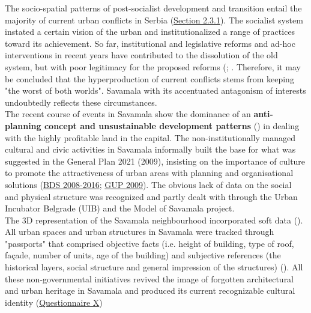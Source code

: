 \documentclass[11pt]{report}
\begin{document}
The socio-spatial patterns of post-socialist development and transition entail the majority of current urban conflicts in Serbia (\href{Section 2.3.1}{Section 2.3.1}).
The socialist system instated a certain vision of the urban and institutionalized a range of practices toward its achievement. So far, institutional and legislative reforms and ad-hoc interventions in recent years have contributed to the dissolution of the old system, but with poor legitimacy for the proposed reforms (\href{ref}{\citealt{world_bank_cities_2000}}; \href{ref}{\citealt{vujosevic_postsocijalisticka_2010}}.
Therefore, it may be concluded that the hyperproduction of current conflicts stems from keeping "the worst of both worlds".
Savamala with its accentuated antagonism of interests undoubtedly reflects these circumstances.
\\

The recent course of events in Savamala show the dominance of an  \textbf{anti-planning concept and unsustainable development patterns} (\href{ref}{\citealt{vujosevic_postsocijalisticka_2010}}) in dealing with the highly profitable land in the capital. The non-institutionally managed cultural and civic activities in Savamala informally built the base for what was suggested in the General Plan 2021 (2009), insisting on the importance of culture to promote the attractiveness of urban areas with planning and organisational solutions (\href{BDS}{BDS 2008-2016}; \href{GP 2009}{GUP 2009}).
The obvious lack of data on the social and physical structure was recognized and partly dealt with through the Urban Incubator Belgrade (UIB) and the Model of Savamala project.
\\

The 3D representation of the Savamala neighbourhood incorporated soft data (\href{ref}{\citealt{cvetinovic_engine_2013}}).
All urban spaces and urban structures in Savamala were tracked through "passports" that comprised objective facts (i.e. height of building, type of roof, façade, number of units, age of the building) and subjective references (the historical layers, social structure and general impression of the structures) (\href{ref}{\citealt{lee_yaniya_model_2013}}).
All these non-governmental initiatives revived the image of forgotten architectural and urban heritage in Savamala and produced its current recognizable cultural identity
(\href{Questionnaire PhD Savamala}{Questionnaire X})
\\
\end{document}
